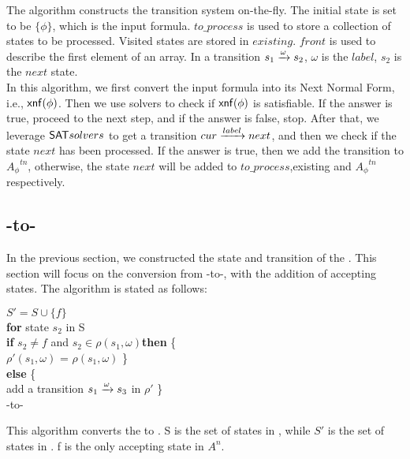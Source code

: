 The algorithm constructs the transition system on-the-fly. The initial state is set to be $\{\phi\}$, which is the input formula. $to\_process$ is used to store a collection of states to be processed. Visited states are stored in $existing$. $front$ is used to describe the first element of an array. In a transition $s_1\xrightarrow[]{\omega}s_2$, $\omega$ is the $label$, $s_2$ is the $next$ state. \\
In this algorithm, we first convert the input formula into its Next Normal Form, i.e., ${\sf xnf}(\phi)$. Then we use \SAT solvers to check if ${\sf xnf}(\phi)$ is satisfiable. If the answer is true, proceed to the next step, and if the answer is false, stop. After that, we leverage ${\sf SAT} solvers$ to get a transition $cur\xrightarrow[]{label}next$, and then we check if the state $next$ has been processed. If the answer is true, then we add the transition to ${A_{\phi}}^{tn}$, otherwise, the state $next$ will be added to  $to\_process$,existing and ${A_{\phi}}^{tn}$ respectively.


\subsection{\TNFA-to-\NFA}  
In the previous section, we constructed the state and transition of the \TNFA. This section will focus on the conversion from \TNFA-to-\NFA, with the addition of accepting states. The algorithm is stated as follows:\\

\IncMargin{1em}
 \begin{algorithm}[H]
    \SetAlgoNoLine
    \BlankLine
 
\qquad  $S' = S\cup \{f\}$   \\
\qquad  \textbf{for} state $s_2$ in S \\
\qquad \quad \textbf{if} $s_2\not = f$ and $s_2\in \rho(s_1, \omega)$\textbf{then} \{  \\
\qquad \qquad  $\rho'(s_1,\omega)$ = $\rho(s_1, \omega)$ \} \\
\qquad \quad \textbf{else} \{  \\
\qquad \qquad add a transition $s_1\xrightarrow[]{\omega}s_3$ in $\rho'$
\} \\
 \caption{\TNFA-to-\NFA}
\end{algorithm}

This algorithm converts the \TNFA to \NFA. S is the set of states in \TNFA, while $S'$ is the set of states in \NFA. f is the only accepting state in \NFA $A^{n}$. \\
